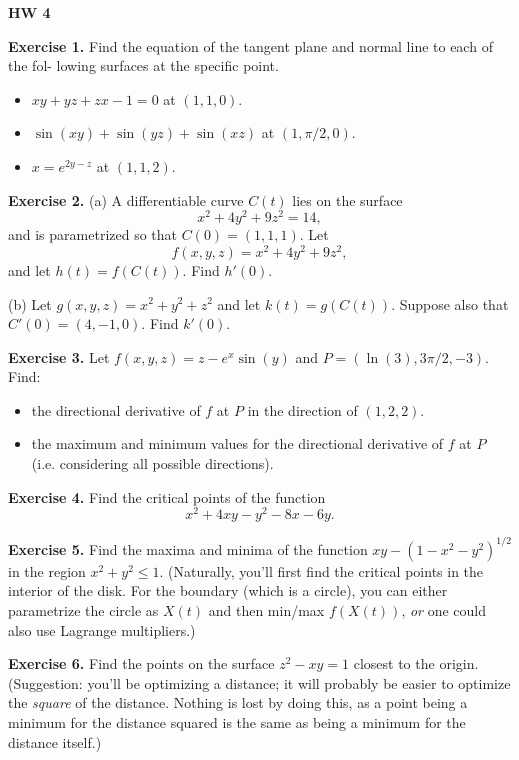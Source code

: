 \documentclass{article}
\begin{document}

\textbf{HW 4}

\textbf{Exercise 1.} Find the equation of the tangent plane and normal line to each of the fol-
lowing surfaces at the specific point.
\begin{itemize}
    \item $xy+yz+zx-1=0$ at $(1,1,0)$.
    \item $\sin(xy) + \sin(yz) + \sin(xz)$ at $(1,\pi/2,0)$.
    \item $x=e^{2y-z}$ at $(1,1,2)$.
\end{itemize}

\textbf{Exercise 2.} 
(a) A differentiable curve $C(t)$ lies on the surface
\[x^2 + 4y^2 + 9z^2 = 14,\]
and is parametrized so that $C(0) = (1,1,1)$. Let 
\[f(x,y,z) = x^2 + 4y^2 + 9z^2,\]
and let $h(t) = f(C(t))$. Find $h'(0)$.

(b) Let $g(x,y,z) = x^2 + y^2 + z^2$ and let $k(t) = g(C(t))$.
Suppose also that $C'(0)=(4,-1,0)$. Find $k'(0)$.

\textbf{Exercise 3.} 
Let $f(x,y,z) = z - e^x \sin(y)$ and $P=(\ln(3), 3\pi/2, -3)$.
Find:
\begin{itemize}
    \item the directional derivative of $f$ at $P$ in the direction of $(1,2,2)$.
    \item the maximum and minimum values for the directional derivative of $f$ at $P$ (i.e. considering all possible directions).
\end{itemize}

\textbf{Exercise 4.} 
Find the critical points of the function
\[x^2+4xy-y^2-8x-6y.\]

\textbf{Exercise 5.}
Find the maxima and minima of the function $xy - (1-x^2-y^2)^{1/2}$ in the region
$x^2+y^2 \leq 1$. (Naturally, you'll first find the critical points 
in the interior of the disk. For the boundary (which is a circle), you can either parametrize
the circle as $X(t)$ and then min/max $f(X(t))$, \emph{or} one could also
use Lagrange multipliers.)

\textbf{Exercise 6.} Find the points on the surface $z^2 - xy = 1$ closest to the origin.
(Suggestion: you'll be optimizing a distance; it will probably be easier to optimize the \emph{square}
of the distance. Nothing is lost by doing this, as a point being a minimum for the distance squared is the
same as being a minimum for the distance itself.)
\end{document}
